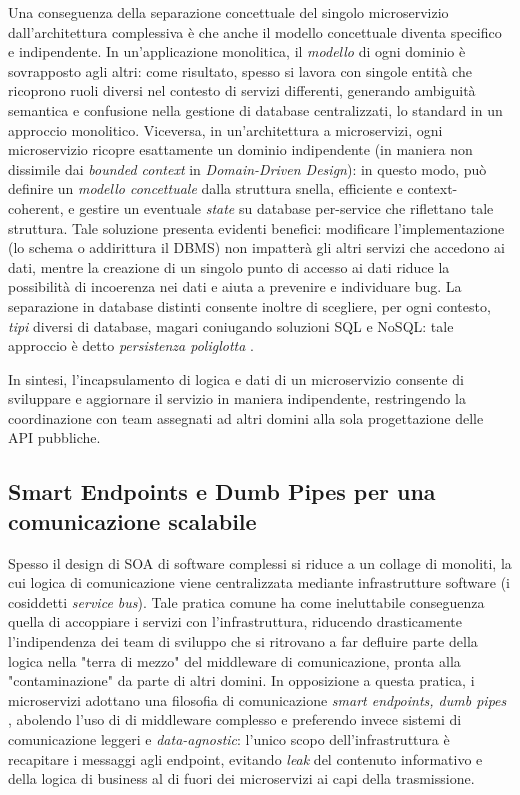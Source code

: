 Una conseguenza della separazione concettuale del singolo microservizio dall'architettura complessiva è che anche il modello concettuale diventa specifico e indipendente. In un'applicazione monolitica, il \emph{modello} di ogni dominio è sovrapposto agli altri: come risultato, spesso si lavora con singole entità che ricoprono ruoli diversi nel contesto di servizi differenti, generando ambiguità semantica e confusione nella gestione di database centralizzati, lo standard in un approccio monolitico.
Viceversa, in un'architettura a microservizi, ogni microservizio ricopre esattamente un dominio indipendente (in maniera non dissimile dai \emph{bounded context} in \emph{Domain-Driven Design}): in questo modo, può definire un \emph{modello concettuale} dalla struttura snella, efficiente e context-coherent, e gestire un eventuale \emph{state} su database per-service che riflettano tale struttura.
Tale soluzione presenta evidenti benefici: modificare l'implementazione (lo schema o addirittura il DBMS) non impatterà gli altri servizi che accedono ai dati, mentre la creazione di un singolo punto di accesso ai dati riduce la possibilità di incoerenza nei dati e aiuta a prevenire e individuare bug.
La separazione in database distinti consente inoltre di scegliere, per ogni contesto, \emph{tipi} diversi di database, magari coniugando soluzioni SQL e NoSQL: tale approccio è detto \emph{persistenza poliglotta} \cite[29]{.NET_Microservices}.

In sintesi, l'incapsulamento di logica e dati di un microservizio consente di sviluppare e aggiornare il servizio in maniera indipendente, restringendo la coordinazione con team assegnati ad altri domini alla sola progettazione delle API pubbliche.

\subsection{Smart Endpoints e Dumb Pipes per una comunicazione scalabile}
Spesso il design di SOA di software complessi si riduce a un collage di monoliti, la cui logica di comunicazione viene centralizzata mediante infrastrutture software (i cosiddetti \emph{service bus}). Tale pratica comune ha come ineluttabile conseguenza quella di accoppiare i servizi con l'infrastruttura, riducendo drasticamente l'indipendenza dei team di sviluppo che si ritrovano a far defluire parte della logica nella "terra di mezzo" del middleware di comunicazione, pronta alla "contaminazione" da parte di altri domini.
In opposizione a questa pratica, i microservizi adottano una filosofia di comunicazione \emph{smart endpoints, dumb pipes} \cite[19]{Thesis_microservices}, abolendo l'uso di di middleware complesso e preferendo invece sistemi di comunicazione leggeri e \emph{data-agnostic}: l'unico scopo dell'infrastruttura è recapitare i messaggi agli endpoint, evitando \emph{leak} del contenuto informativo e della logica di business al di fuori dei microservizi ai capi della trasmissione.

